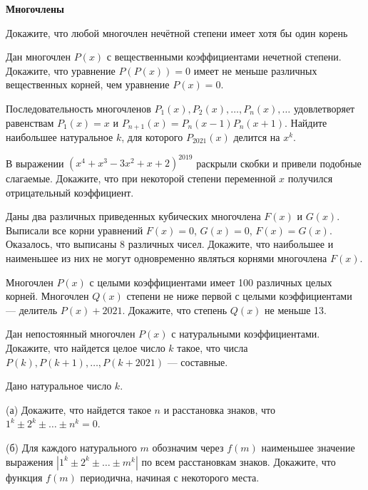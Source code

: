 \documentclass{article}
\begin{document}
    \large

    \begin{center}
        \textbf{Многочлены}
    \end{center}

    \begin{enumerate_boxed}

        \item Докажите, что любой многочлен нечётной степени имеет хотя бы один корень

        \item Дан многочлен $P(x)$ с вещественными коэффициентами нечетной степени.
        Докажите, что уравнение $P(P(x)) = 0$ имеет не меньше различных вещественных корней, чем уравнение $P(x) = 0$.

        \item Последовательность многочленов $P_1(x), P_2(x), \ldots, P_n(x), \ldots$ удовлетворяет равенствам $P_1(x) = x$ и $P_{n+1}(x) = P_n(x - 1)P_n(x + 1)$.
        Найдите наибольшее натуральное $k$, для которого $P_{2021}(x)$ делится на $x^k$.

        \item В выражении $(x^4 + x^3 - 3x^2 + x + 2)^{2019}$ раскрыли скобки и привели подобные слагаемые.
        Докажите, что при некоторой степени переменной $x$ получился отрицательный коэффициент.

        \item Даны два различных приведенных кубических многочлена $F(x)$ и $G(x)$.
        Выписали все корни уравнений $F(x) = 0$, $G(x) = 0$, $F(x) = G(x)$.
        Оказалось, что выписаны 8 различных чисел.
        Докажите, что наибольшее и наименьшее из них не могут одновременно являться корнями многочлена $F(x)$.

        \item Многочлен $P(x)$ с целыми коэффициентами имеет 100 различных целых корней.
        Многочлен $Q(x)$ степени не ниже первой с целыми коэффициентами — делитель $P(x) + 2021$.
        Докажите, что степень $Q(x)$ не меньше 13.

        \item Дан непостоянный многочлен $P(x)$ с натуральными коэффициентами.
        Докажите, что найдется целое число $k$ такое, что числа $P(k), P(k+1), \ldots, P(k+2021)$ — составные.

        \item Дано натуральное число $k$.

        (а) Докажите, что найдется такое $n$ и расстановка знаков, что $1^k \pm 2^k \pm \ldots \pm n^k = 0$.

        (б) Для каждого натурального $m$ обозначим через $f(m)$ наименьшее значение выражения $|1^k \pm 2^k \pm \ldots \pm m^k|$ по всем расстановкам знаков.
        Докажите, что функция $f(m)$ периодична, начиная с некоторого места.


    \end{enumerate_boxed}
\end{document}
